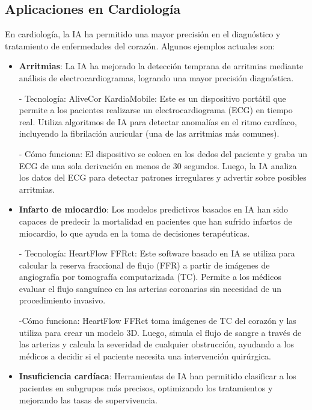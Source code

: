 \documentclass{article}
\begin{document}
\subsection{Aplicaciones en Cardiología}
En cardiología, la IA ha permitido una mayor precisión en el diagnóstico y tratamiento de enfermedades del corazón. Algunos ejemplos actuales son:

\begin{itemize}
    \item \textbf{Arritmias}:
    La IA ha mejorado la detección temprana de arritmias mediante análisis de electrocardiogramas, logrando una mayor precisión diagnóstica.
    
    - Tecnología: AliveCor KardiaMobile: Este es un dispositivo portátil que permite a los pacientes realizarse un electrocardiograma (ECG) en tiempo real. Utiliza algoritmos de IA para detectar anomalías en el ritmo cardíaco, incluyendo la fibrilación auricular (una de las arritmias más comunes).
    
    - Cómo funciona: El dispositivo se coloca en los dedos del paciente y graba un ECG de una sola derivación en menos de 30 segundos. Luego, la IA analiza los datos del ECG para detectar patrones irregulares y advertir sobre posibles arritmias.
    
    \item \textbf{Infarto de miocardio}:
    Los modelos predictivos basados en IA han sido capaces de predecir la mortalidad en pacientes que han sufrido infartos de miocardio, lo que ayuda en la toma de decisiones terapéuticas.
    
    - Tecnología: HeartFlow FFRct: Este software basado en IA se utiliza para calcular la reserva fraccional de flujo (FFR) a partir de imágenes de angiografía por tomografía computarizada (TC). Permite a los médicos evaluar el flujo sanguíneo en las arterias coronarias sin necesidad de un procedimiento invasivo.
    
    -Cómo funciona: HeartFlow FFRct toma imágenes de TC del corazón y las utiliza para crear un modelo 3D. Luego, simula el flujo de sangre a través de las arterias y calcula la severidad de cualquier obstrucción, ayudando a los médicos a decidir si el paciente necesita una intervención quirúrgica.
    
    \item \textbf{Insuficiencia cardíaca}:
    Herramientas de IA han permitido clasificar a los pacientes en subgrupos más precisos, optimizando los tratamientos y mejorando las tasas de supervivencia.
    

\end{itemize}
\end{document}
